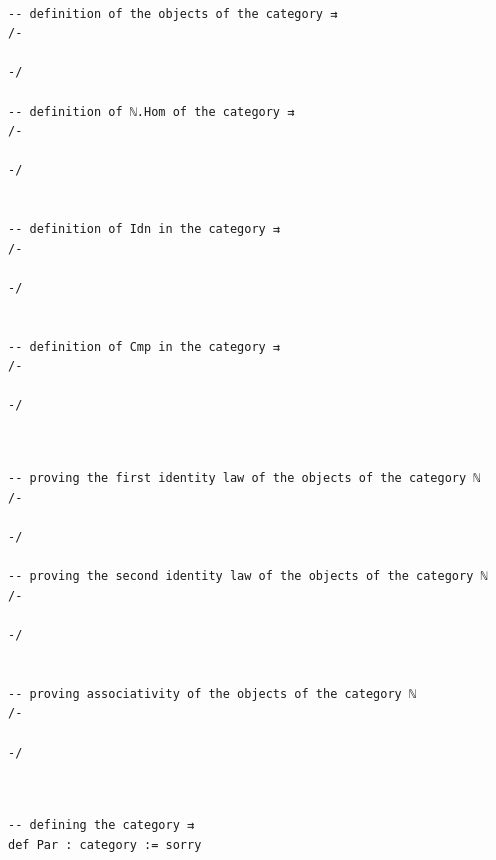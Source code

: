 \documentclass{book}
\newcounter{lcounter}
\begin{document}
\begin{center}
\begin{tcolorbox}[width=5in,colback={white},title={\begin{center}\texttt{Lean \thelcounter} \addtocounter{lcounter}{1}  \end{center}},colbacktitle=Blue,coltitle=black]
\begin{verbatim}

-- definition of the objects of the category ⇉
/-

-/

-- definition of ℕ.Hom of the category ⇉
/-

-/


-- definition of Idn in the category ⇉
/-

-/


-- definition of Cmp in the category ⇉
/-

-/


\end{verbatim}%
\end{tcolorbox}
\end{center}


\begin{center}
\begin{tcolorbox}[width=5in,colback={white},title={\begin{center}\texttt{Lean \thelcounter} \addtocounter{lcounter}{1}  \end{center}},colbacktitle=Blue,coltitle=black]
\begin{verbatim}

-- proving the first identity law of the objects of the category ℕ
/-

-/

-- proving the second identity law of the objects of the category ℕ
/-

-/


-- proving associativity of the objects of the category ℕ
/-

-/


\end{verbatim}%
\end{tcolorbox}
\end{center}

\begin{center}
\begin{tcolorbox}[width=5in,colback={white},title={\begin{center}\texttt{Lean \thelcounter} \addtocounter{lcounter}{1}  \end{center}},colbacktitle=Blue,coltitle=black]
\begin{verbatim}

-- defining the category ⇉
def Par : category := sorry

\end{verbatim}%
\end{tcolorbox}
\end{center}
\end{document}
